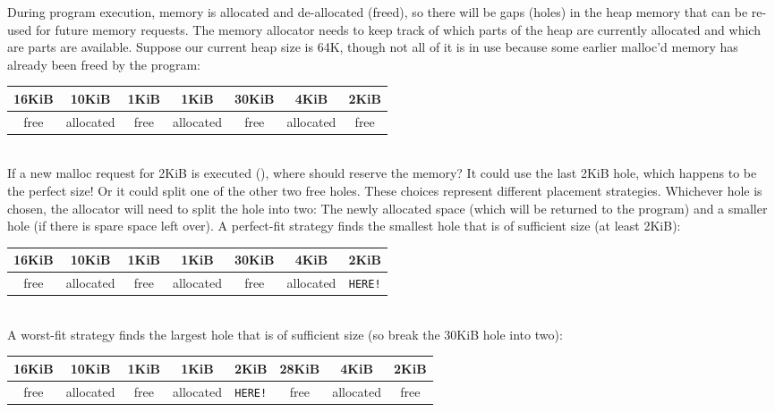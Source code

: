 During program execution, memory is allocated and de-allocated (freed), so there will be gaps (holes) in the heap memory that can be re-used for future memory requests.
The memory allocator needs to keep track of which parts of the heap are currently allocated and which are parts are available.
Suppose our current heap size is 64K, though not all of it is in use because some earlier malloc'd memory has already been freed by the program:
\\
\begin{center}
\begin{tabular}{ | c | c | c | c | c | c | c | }
\hline
16KiB & 10KiB & 1KiB & 1KiB & 30KiB & 4KiB & 2KiB \\ \hline
free & allocated & free & allocated & free & allocated & free \\
\hline
\end{tabular}
\end{center}
\\
If a new malloc request for 2KiB is executed (), where should  reserve the memory?
It could use the last 2KiB hole, which happens to be the perfect size!
Or it could split one of the other two free holes.
These choices represent different placement strategies.
Whichever hole is chosen, the allocator will need to split the hole into two: The newly allocated space (which will be returned to the program) and a smaller hole (if there is spare space left over).
A perfect-fit strategy finds the smallest hole that is of sufficient size (at least 2KiB):
\\
\begin{center}
\begin{tabular}{ | c | c | c | c | c | c | c | }
\hline
16KiB & 10KiB & 1KiB & 1KiB & 30KiB & 4KiB & 2KiB \\ \hline
free & allocated & free & allocated & free & allocated & \texttt{HERE!} \\
\hline
\end{tabular}
\end{center}
\\
A worst-fit strategy finds the largest hole that is of sufficient size (so break the 30KiB hole into two):
\\
\begin{center}
\begin{tabular}{ | c | c | c | c | c | c | c | c | }
\hline
16KiB & 10KiB & 1KiB & 1KiB & 2KiB & 28KiB & 4KiB & 2KiB \\ \hline
free & allocated & free & allocated & \texttt{HERE!} & free & allocated & free \\
\hline
\end{tabular}
\end{center}
